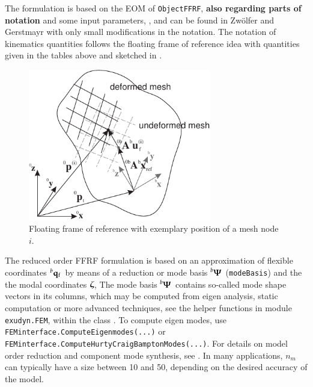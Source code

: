     \finishTable
    The formulation is based on the EOM of \texttt{ObjectFFRF}, {\bf also regarding parts of notation} 
    and some input parameters, , and 
    can be found in Zw{\"o}lfer and Gerstmayr \cite{ZwoelferGerstmayr2021} with only small modifications in the notation.
    The notation of kinematics quantities follows the floating frame of reference idea with
    quantities given in the tables above and sketched in .
    \begin{figure}[tbph]
      \begin{center}
      \includegraphics[width=8cm]{figures/ObjectFFRFsketch.pdf}
      \end{center}
      \caption{Floating frame of reference with exemplary position of a mesh node $i$.}
    	\label{fig:ObjectFFRFreducedOrder:mesh}
    \end{figure}

                       
    The reduced order FFRF formulation is based on an approximation of flexible coordinates $\prescript{b}{}{\mathbf{q}_\mathrm{f}}\,$ 
    by means of a reduction or mode basis $\prescript{b}{}{\mbox{\boldmath $\Psi$ \unboldmath}\!\!}\,$ (\texttt{modeBasis}) and the the modal coordinates $\mbox{\boldmath $\zeta$ \unboldmath}\!\!$,
    \be
       \approx {} \tzeta
    \ee
    The mode basis $\prescript{b}{}{\mbox{\boldmath $\Psi$ \unboldmath}\!\!}\,$ contains so-called mode shape vectors in its columns, which may be computed from eigen analysis, static computation or more advanced techniques, 
    see the helper functions in module \texttt{exudyn.FEM}, within the class .
    To compute eigen modes, use \texttt{FEMinterface.ComputeEigenmodes(...)} or
    \texttt{FEMinterface.ComputeHurtyCraigBamptonModes(...)}. For details on model order reduction and component mode synthesis, see .
    In many applications, $n_m$ can typically have a size between 10 and 50, depending on the desired accuracy of the model.
    
